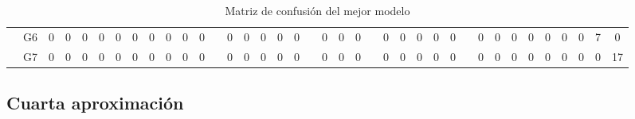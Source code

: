 \documentclass[12pt]{article}
\begin{document}
\begin{table}[!ht]
{\begin{tabular}{cccccccccccccccccccccccccccccccccccccc}
\multicolumn{1}{c|}{}                       & \multicolumn{1}{c|}{G6}  & \multicolumn{1}{c|}{0}  & \multicolumn{1}{c|}{0}  & \multicolumn{1}{c|}{0}  & \multicolumn{1}{c|}{0}  & \multicolumn{1}{c|}{0}  & \multicolumn{1}{c|}{0}  & \multicolumn{1}{c|}{0}  & \multicolumn{1}{c|}{0}  & \multicolumn{1}{c|}{0}  & \multicolumn{1}{c|}{0}  & \multicolumn{1}{c|}{}                     & \multicolumn{1}{c|}{0}  & \multicolumn{1}{c|}{0}  & \multicolumn{1}{c|}{0}  & \multicolumn{1}{c|}{0}  & \multicolumn{1}{c|}{0}  & \multicolumn{1}{c|}{}                     & \multicolumn{1}{c|}{0}  & \multicolumn{1}{c|}{0}  & \multicolumn{1}{c|}{0}  & \multicolumn{1}{c|}{}                     & \multicolumn{1}{c|}{0}  & \multicolumn{1}{c|}{0}  & \multicolumn{1}{c|}{0}  & \multicolumn{1}{c|}{0}  & \multicolumn{1}{c|}{0}  & \multicolumn{1}{c|}{}                     & \multicolumn{1}{c|}{0}  & \multicolumn{1}{c|}{0}  & \multicolumn{1}{c|}{0}  & \multicolumn{1}{c|}{0}  & \multicolumn{1}{c|}{0}  & \multicolumn{1}{c|}{0}  & \multicolumn{1}{c|}{0}  & \multicolumn{1}{c|}{7}  & \multicolumn{1}{c|}{0}  \\ \cline{2-12} \cline{14-18} \cline{20-22} \cline{24-28} \cline{30-38} 
\multicolumn{1}{c|}{}                       & \multicolumn{1}{c|}{G7}  & \multicolumn{1}{c|}{0}  & \multicolumn{1}{c|}{0}  & \multicolumn{1}{c|}{0}  & \multicolumn{1}{c|}{0}  & \multicolumn{1}{c|}{0}  & \multicolumn{1}{c|}{0}  & \multicolumn{1}{c|}{0}  & \multicolumn{1}{c|}{0}  & \multicolumn{1}{c|}{0}  & \multicolumn{1}{c|}{0}  & \multicolumn{1}{c|}{}                     & \multicolumn{1}{c|}{0}  & \multicolumn{1}{c|}{0}  & \multicolumn{1}{c|}{0}  & \multicolumn{1}{c|}{0}  & \multicolumn{1}{c|}{0}  & \multicolumn{1}{c|}{}                     & \multicolumn{1}{c|}{0}  & \multicolumn{1}{c|}{0}  & \multicolumn{1}{c|}{0}  & \multicolumn{1}{c|}{}                     & \multicolumn{1}{c|}{0}  & \multicolumn{1}{c|}{0}  & \multicolumn{1}{c|}{0}  & \multicolumn{1}{c|}{0}  & \multicolumn{1}{c|}{0}  & \multicolumn{1}{c|}{}                     & \multicolumn{1}{c|}{0}  & \multicolumn{1}{c|}{0}  & \multicolumn{1}{c|}{0}  & \multicolumn{1}{c|}{0}  & \multicolumn{1}{c|}{0}  & \multicolumn{1}{c|}{0}  & \multicolumn{1}{c|}{0}  & \multicolumn{1}{c|}{0}  & \multicolumn{1}{c|}{17} \\ \cline{2-38} 
		\end{tabular}
	}
	\caption{Matriz de confusión del mejor modelo }
	\label{tab:confusion_matrix_3}
\end{table}

\newpage
\subsection{Cuarta aproximación}
\label{Cuarta aproximación}
\end{document}
